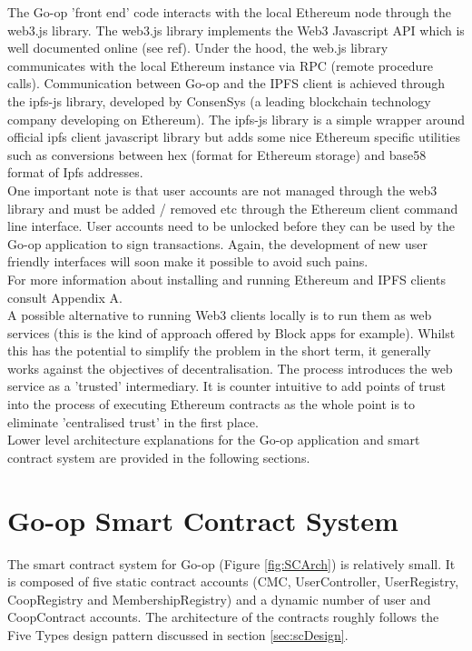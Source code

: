The Go-op 'front end' code interacts with the local Ethereum node through the web3.js library\cite{Web3JS}. The web3.js library implements the Web3 Javascript API\cite{JavascriptAPI} which is well documented online (see ref). Under the hood, the web.js library communicates with the local Ethereum instance via RPC (remote procedure calls). Communication between Go-op and the IPFS client is achieved through the ipfs-js\cite{ipfs-js} library, developed by ConsenSys (a leading blockchain technology company developing on Ethereum). The ipfs-js library is a simple wrapper around official ipfs client javascript library but adds some nice Ethereum specific utilities such as conversions between hex (format for Ethereum storage) and base58 format of Ipfs addresses. \\

One important note is that user accounts are not managed through the web3 library and must be added / removed etc through the Ethereum client command line interface. User accounts need to be unlocked before they can be used by the Go-op application to sign transactions. Again, the development of new user friendly interfaces will soon make it possible to avoid such pains. \\

For more information about installing and running Ethereum and IPFS clients consult Appendix A. \\

A possible alternative to running Web3 clients locally is to run them as web services (this is the kind of approach offered by Block apps\cite{BlockApps} for example). Whilst this has the potential to simplify the problem in the short term, it generally works against the objectives of decentralisation. The process introduces the web service as a 'trusted' intermediary. It is counter intuitive to add points of trust into the process of executing Ethereum contracts as the whole point is to eliminate 'centralised trust' in the first place. \\

Lower level architecture explanations for the Go-op application and smart contract system are provided in the following sections. \\

\section{Go-op Smart Contract System}
The smart contract system for Go-op (Figure \ref{fig:SCArch}) is relatively small. It is composed of five static contract accounts (CMC, UserController, UserRegistry, CoopRegistry and MembershipRegistry) and a dynamic number of user and CoopContract accounts. The architecture of the contracts roughly follows the Five Types design pattern discussed in section \ref{sec:scDesign}.\\ 

